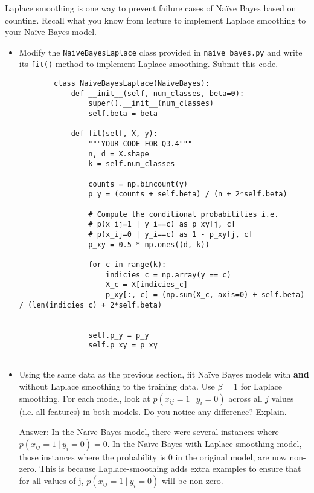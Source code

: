 \documentclass{article}
\newcommand{\blu}[1]{{\textcolor{blu}{#1}}}
\newcommand{\gre}[1]{\textcolor{gre}{#1}}
\newcommand\ans[1]{\par\gre{Answer: #1}}
\let\ask\blu
\begin{document}
    Laplace smoothing is one way to prevent failure cases of Na\"ive Bayes based on counting. Recall what you know from lecture to implement Laplace smoothing to your Na\"ive Bayes model.
    \begin{itemize}
        \item Modify the \texttt{NaiveBayesLaplace} class provided in \texttt{naive\_bayes.py} and write its \texttt{fit()} method to implement Laplace smoothing. \ask{Submit this code.}
        \begin{verbatim}
        class NaiveBayesLaplace(NaiveBayes):
            def __init__(self, num_classes, beta=0):
                super().__init__(num_classes)
                self.beta = beta
        
            def fit(self, X, y):
                """YOUR CODE FOR Q3.4"""
                n, d = X.shape
                k = self.num_classes
        
                counts = np.bincount(y)
                p_y = (counts + self.beta) / (n + 2*self.beta)
        
                # Compute the conditional probabilities i.e.
                # p(x_ij=1 | y_i==c) as p_xy[j, c]
                # p(x_ij=0 | y_i==c) as 1 - p_xy[j, c]
                p_xy = 0.5 * np.ones((d, k)) 
                
                for c in range(k):
                    indicies_c = np.array(y == c)
                    X_c = X[indicies_c]
                    p_xy[:, c] = (np.sum(X_c, axis=0) + self.beta) / (len(indicies_c) + 2*self.beta)
        
        
                self.p_y = p_y
                self.p_xy = p_xy
        
        \end{verbatim}
        \item Using the same data as the previous section, fit Na\"ive Bayes models with \textbf{and} without Laplace smoothing to the training data. Use $\beta=1$ for Laplace smoothing. For each model, look at $p(x_{ij} = 1 \ | \ y_i = 0)$ across all $j$ values (i.e. all features) in both models. \ask{Do you notice any difference? Explain.}
        
        \ans{ In the Na\"ive Bayes model, there were several instances where $p(x_{ij} = 1 \ | \ y_i = 0) = 0$. In the Na\"ive Bayes with Laplace-smoothing model, those instances where the probability is 0 in the original model, are now non-zero. This is because Laplace-smoothing adds extra examples to ensure that for all values of j, $p(x_{ij} = 1 \ | \ y_i = 0)$ will be non-zero. }
        

\end{itemize}
\end{document}

